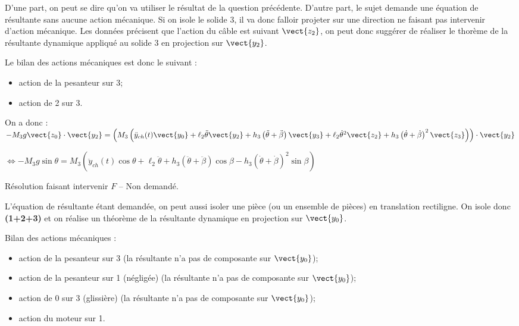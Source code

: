\ifprof
\begin{corrige}

D'une part, on peut se dire qu'on va utiliser le résultat de la question précédente. D'autre part, le sujet demande une équation de résultante sans aucune action mécanique. Si on isole le solide 3, il va donc falloir projeter sur une direction ne faisant pas intervenir d'action mécanique. Les données précisent que l'action du câble est suivant $\vect{z_2}$, on peut donc suggérer de réaliser le thorème de la résultante dynamique appliqué au solide 3 en projection sur $\vect{y_2}$. 

Le bilan des actions mécaniques est donc le suivant : 
\begin{itemize}
\item action de la pesanteur sur 3;
\item action de 2 sur 3.
\end{itemize}

On a donc :
$-M_3 g \vect{z_0}\cdot \vect{y_2} = 
\left( M_3\left(\ddot{y}_{ch}(t) \vect{y_0}+\ell_2\ddot{\theta} \vect{y_2}+h_3\left(\ddot{\theta}+\ddot{\beta}\right) \vect{y_3}
+   
\ell_2\dot{\theta}^2 \vect{z_2}  +h_3\left(\dot{\theta}+\dot{\beta}\right)^2\vect{z_3}\right)\right) \cdot \vect{y_2}$

$ \Leftrightarrow -M_3 g \sin \theta  = 
 M_3\left(\ddot{y}_{ch}(t) \cos \theta +\ell_2\ddot{\theta} +h_3\left(\ddot{\theta}+\ddot{\beta}\right)\cos \beta 
-h_3\left(\dot{\theta}+\dot{\beta}\right)^2\sin\beta \right)$


\vspace{.6cm}
Résolution faisant intervenir $F$ -- Non demandé.

L'équation de résultante étant demandée, on peut aussi isoler une pièce (ou un ensemble de pièces) en translation rectiligne. On isole donc \textbf{(1+2+3)} et on réalise un théorème de la résultante dynamique en projection sur $\vect{y_0}$. 

Bilan des actions mécaniques : 
\begin{itemize}
\item action de la pesanteur sur 3 (la résultante n'a pas de composante sur $\vect{y_0}$);
\item action de la pesanteur sur 1 (négligée) (la résultante n'a pas de composante sur $\vect{y_0}$);
\item action de 0 sur 3 (glissière) (la résultante n'a pas de composante sur $\vect{y_0}$);
\item action du moteur sur 1.
\end{itemize}


\end{corrige}
